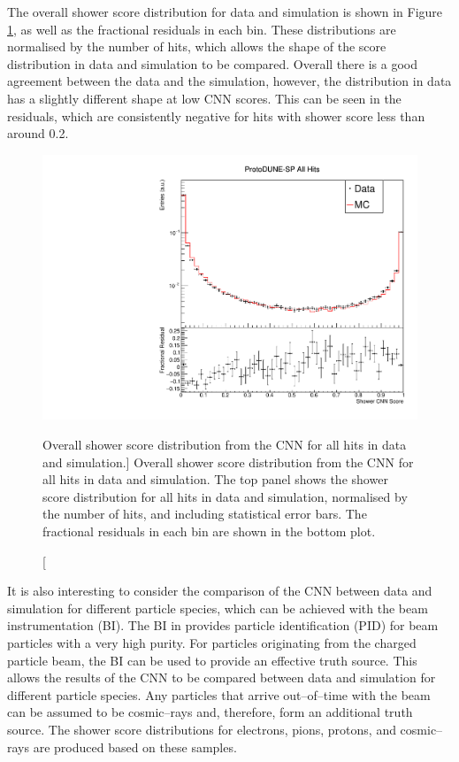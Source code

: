 The overall shower score distribution for data and simulation is shown in 
Figure \ref{fig:cnn_overall_score}, as well as the fractional residuals in 
each bin. These distributions are normalised by the number of hits, which allows
the shape of the score distribution in data and simulation to be 
compared.  Overall there is a good agreement between the data and the 
simulation, however, the distribution in data has a slightly different shape 
at low CNN scores. This can be seen in the residuals, which are consistently 
negative for hits with shower score less than around 0.2.
\begin{figure}
	\centering
	\includegraphics[width=\textwidth]{figures/hit_cnn_all.pdf}
	\caption
	[Overall shower score distribution from the CNN for all hits in data and simulation.]
	{Overall shower score distribution from the CNN for all hits in data and
	simulation. The top panel shows the shower score distribution for all hits in
	data and simulation, normalised by the number of hits, and including
	statistical error bars. The fractional residuals in each bin are shown in the 
	bottom plot.}
	\label{fig:cnn_overall_score}
\end{figure}

It is also interesting to consider the comparison of the CNN between data and
simulation for different particle species, which can be achieved with the beam
instrumentation (BI). The BI in \protodune{} provides particle identification 
(PID) for beam particles with a very high purity. For particles originating 
from the charged particle beam, the BI can be used to provide an effective 
truth source. This allows the results of the CNN to be compared between data 
and simulation for different particle species. Any particles that arrive 
out--of--time with the beam can be assumed to be cosmic--rays and, therefore, 
form an additional truth source. The shower score distributions for electrons, 
pions, protons, and cosmic--rays are produced based on these samples. 

